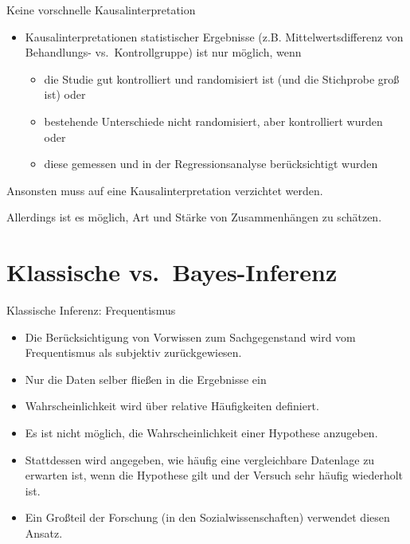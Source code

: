 \documentclass[
  ngerman,
  ignorenonframetext,
]{beamer}
\providecommand{\tightlist}{%
  \setlength{\itemsep}{0pt}\setlength{\parskip}{0pt}}
\begin{document}
\begin{frame}{Keine vorschnelle Kausalinterpretation}
\protect\hypertarget{keine-vorschnelle-kausalinterpretation}{}
\begin{itemize}
\tightlist
\item
  Kausalinterpretationen statistischer Ergebnisse (z.B.
  Mittelwertsdifferenz von Behandlungs- vs.~Kontrollgruppe) ist nur
  möglich, wenn

  \begin{itemize}
  \tightlist
  \item
    die Studie gut kontrolliert und randomisiert ist (und die Stichprobe
    groß ist) oder
  \item
    bestehende Unterschiede nicht randomisiert, aber kontrolliert wurden
    oder
  \item
    diese gemessen und in der Regressionsanalyse berücksichtigt wurden
  \end{itemize}
\end{itemize}

Ansonsten muss auf eine Kausalinterpretation verzichtet werden.

Allerdings ist es möglich, Art und Stärke von Zusammenhängen zu
schätzen.
\end{frame}

\hypertarget{klassische-vs.-bayes-inferenz}{%
\section{Klassische
vs.~Bayes-Inferenz}\label{klassische-vs.-bayes-inferenz}}

\begin{frame}{Klassische Inferenz: Frequentismus}
\protect\hypertarget{klassische-inferenz-frequentismus}{}
\begin{itemize}
\tightlist
\item
  Die Berücksichtigung von Vorwissen zum Sachgegenstand wird vom
  Frequentismus als subjektiv zurückgewiesen.
\item
  Nur die Daten selber fließen in die Ergebnisse ein
\item
  Wahrscheinlichkeit wird über relative Häufigkeiten definiert.
\item
  Es ist nicht möglich, die Wahrscheinlichkeit einer Hypothese
  anzugeben.
\item
  Stattdessen wird angegeben, wie häufig eine vergleichbare Datenlage zu
  erwarten ist, wenn die Hypothese gilt und der Versuch sehr häufig
  wiederholt ist.
\item
  Ein Großteil der Forschung (in den Sozialwissenschaften) verwendet
  diesen Ansatz.
\end{itemize}
\end{frame}
\end{document}
